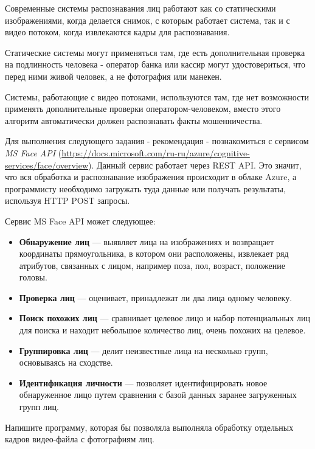 
Современные системы распознавания лиц работают как со статическими изображениями, когда делается снимок, с которым работает система, так и с видео потоком, когда извлекаются кадры для распознавания.

Статические системы могут применяться там, где есть дополнительная проверка на подлинность человека - оператор банка или кассир могут удостовериться, что перед ними живой человек, а не фотография или манекен.

Системы, работающие с видео потоками, используются там, где нет возможности применять дополнительные проверки оператором-человеком, вместо этого алгоритм автоматически должен распознавать факты мошенничества.

Для выполнения следующего задания - рекомендация - познакомиться с сервисом \textit{MS Face API} (\url{https://docs.microsoft.com/ru-ru/azure/cognitive-services/face/overview}). Данный сервис работает через REST API. Это значит, что вся обработка и распознавание изображения происходит в облаке Azure, а программисту необходимо загружать туда данные или получать результаты, используя HTTP POST запросы.

Сервис MS Face API может следующее:
\begin{itemize}
  \item \textbf{Обнаружение лиц} --- выявляет лица на изображениях и возвращает координаты прямоугольника, в котором они расположены, извлекает ряд атрибутов, связанных с лицом, например поза, пол, возраст, положение головы. 
  \item \textbf{Проверка лиц} --- оценивает, принадлежат ли два лица одному человеку.
  \item \textbf{Поиск похожих лиц} --- сравнивает целевое лицо и набор потенциальных лиц для поиска и находит небольшое количество лиц, очень похожих на целевое.
  \item \textbf{Группировка лиц} --- делит неизвестные лица на несколько групп, основываясь на сходстве.
  \item \textbf{Идентификация личности} --- позволяет идентифицировать новое обнаруженное лицо путем сравнения с базой данных заранее загруженных групп лиц.
\end{itemize}

Напишите программу, которая бы позволяла выполняла обработку отдельных кадров видео-файла с фотографиям лиц.


